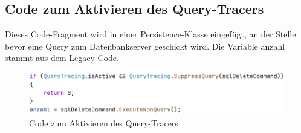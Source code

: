 \documentclass[11pt,toc=sectionentrywithoutdots, 
headheight=44pt, headings=optiontoheadandtoc, hyperfootnotes=false, hypertexnames=false]{scrartcl}
\begin{document}
\subsection{Code zum Aktivieren des Query-Tracers}
Dieses Code-Fragment wird in einer Persistence-Klasse eingefügt, an der Stelle bevor eine Query zum Datenbankserver geschickt wird. Die Variable \glqq anzahl\grqq{} stammt aus dem Legacy-Code.
 \label{fig:Code zum Aktivieren des Query-Tracers}

 \begin{figure}[H]
 \centering

	\includegraphics[scale=0.7]{snippet.png}
	 \caption{Code zum Aktivieren des Query-Tracers}
 \end{figure}
\clearpage 
 
\end{document}
